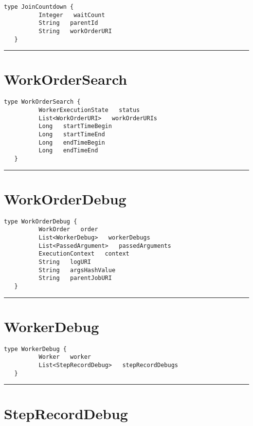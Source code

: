 \begin{lstlisting}[style=nonumbers]
   type JoinCountdown {
          Integer   waitCount
          String   parentId
          String   workOrderURI
   }
\end{lstlisting}

\rule{12cm}{2pt}
\section{WorkOrderSearch}
\label{type:WorkOrderSearch}

\begin{lstlisting}[style=nonumbers]
   type WorkOrderSearch {
          WorkerExecutionState   status
          List<WorkOrderURI>   workOrderURIs
          Long   startTimeBegin
          Long   startTimeEnd
          Long   endTimeBegin
          Long   endTimeEnd
   }
\end{lstlisting}

\rule{12cm}{2pt}
\section{WorkOrderDebug}
\label{type:WorkOrderDebug}

\begin{lstlisting}[style=nonumbers]
   type WorkOrderDebug {
          WorkOrder   order
          List<WorkerDebug>   workerDebugs
          List<PassedArgument>   passedArguments
          ExecutionContext   context
          String   logURI
          String   argsHashValue
          String   parentJobURI
   }
\end{lstlisting}

\rule{12cm}{2pt}
\section{WorkerDebug}
\label{type:WorkerDebug}

\begin{lstlisting}[style=nonumbers]
   type WorkerDebug {
          Worker   worker
          List<StepRecordDebug>   stepRecordDebugs
   }
\end{lstlisting}

\rule{12cm}{2pt}
\section{StepRecordDebug}
\label{type:StepRecordDebug}

